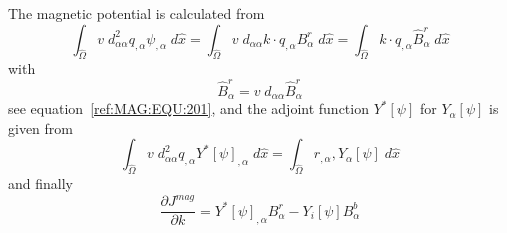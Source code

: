 The magnetic potential is calculated from 
\begin{equation}\label{ref:MAG:EQU:302}
\int_{\widehat{\Omega}} v \; d_{\alpha \alpha}^2 q_{,\alpha} \psi_{,\alpha} \;  d\widehat{x}  
=  \int_{\widehat{\Omega}} v \; d_{\alpha \alpha} k \cdot q_{,\alpha}  B^r_{\alpha} \; d\widehat{x}   
=  \int_{\widehat{\Omega}}  k \cdot q_{,\alpha}  \widehat{B}^r_{\alpha} \; d\widehat{x}   
\end{equation} 
with 
\begin{equation}\label{ref:MAG:EQU:302b}
\widehat{B}^r_{\alpha}  =v \; d_{\alpha \alpha} \widehat{B}^r_{\alpha}
\end{equation} 
see equation~\ref{ref:MAG:EQU:201}, and the adjoint function $Y^*[\psi]$ for $Y_{\alpha}[\psi]$ is given from
\begin{equation}\label{ref:MAG:EQU:303}
\int_{\widehat{\Omega}} v \; d_{\alpha \alpha}^2 q_{,\alpha} Y^*[\psi]_{,\alpha } \;d\widehat{x}  =
\int_{\widehat{\Omega}} r_{,{\alpha}} ,Y_{\alpha}[\psi]  \;d\widehat{x}
\end{equation} 
and finally 
\begin{equation}\label{ref:MAG:EQU:310}
\frac{\partial J^{mag}}{\partial k} = Y^*[\psi]_{,{\alpha}}  B^r_{\alpha} - Y_i[\psi] B^b_{\alpha}
\end{equation} 


